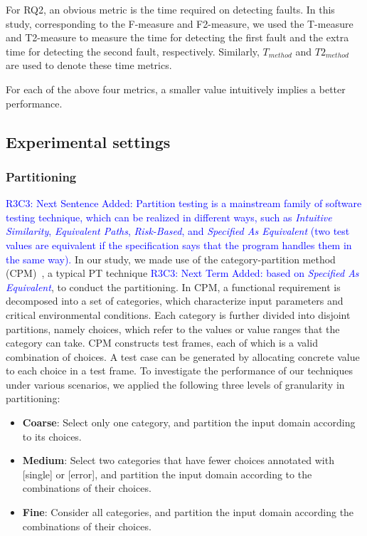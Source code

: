 \documentclass[10pt,journal,compsoc]{IEEEtran}
\begin{document}
For RQ2, an obvious metric is the time required on detecting faults. In this study, corresponding to the F-measure and F2-measure, we used the T-measure and T2-measure to measure the time for detecting the first fault and the extra time for detecting the second fault, respectively. Similarly, $T_{method}$ and $T2_{method}$ are used to denote these time metrics.

For each of the above four metrics, a smaller value intuitively implies a better performance.

\subsection{Experimental settings}

\subsubsection{Partitioning}

\textcolor{blue}{R3C3: Next Sentence Added: Partition testing is a mainstream family of software testing technique, which can be realized in different ways, such as \emph{Intuitive Similarity}, \emph{Equivalent Paths}, \emph{Risk-Based}, and \emph{Specified As Equivalent} (two test values are equivalent if the specification says that the program handles them in the same way).} In our study, we made use of the category-partition method (CPM)~\cite{Ostrand88}, a typical PT technique \textcolor{blue}{R3C3: Next Term Added: based on \emph{Specified As Equivalent}}, to conduct the partitioning. In CPM, a functional requirement is decomposed into a set of categories, which characterize input parameters and critical environmental conditions. Each category is further divided into disjoint partitions, namely choices, which refer to the values or value ranges that the category can take. CPM constructs test frames, each of which is a valid combination of choices. A test case can be generated by allocating concrete value to each choice in a test frame. To investigate the performance of our techniques under various scenarios, we applied the following three levels of granularity in partitioning:

\begin{itemize}
\item \textbf{Coarse}: Select only one category, and partition the input domain according to its choices.
\item \textbf{Medium}: Select two categories that have fewer choices annotated with [single] or [error], and partition the input domain according to the combinations of their choices.
\item \textbf{Fine}: Consider all categories, and partition the input domain according the combinations of their choices.
\end{itemize}
\end{document}
